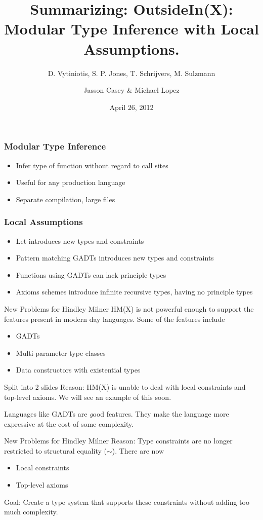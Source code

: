 \documentclass{beamer}
\title{Summarizing: OutsideIn(X): Modular Type Inference with Local Assumptions.}
\subtitle{D. Vytiniotis, S. P. Jones, T. Schrijvers, M. Sulzmann}
\author{Jasson Casey \& Michael Lopez}
\date{April 26, 2012}
\begin{document}
\begin{frame}
\titlepage
\end{frame}

\begin{frame}
\frametitle{Modular Type Inference}
\begin{itemize}
\item Infer type of function without regard to call sites
\item Useful for any production language
\item Separate compilation, large files
\end{itemize}
\end{frame}

\begin{frame}
\frametitle{Local Assumptions}
\begin{itemize}
\item Let introduces new types and constraints
\item Pattern matching GADTs introduces new types and constraints
\item Functions using GADTs can lack principle types
\item Axioms schemes introduce infinite recursive types, having no principle types
\end{itemize}
\end{frame}

\begin{frame}{New Problems for Hindley Milner}
HM(X) is not powerful enough to support the features present in modern day languages. Some of the features include
\begin{itemize}
\item GADTs
\item Multi-parameter type classes
\item Data constructors with existential types
\end{itemize}
Split into 2 slides
Reason: HM(X) is unable to deal with local constraints and top-level axioms. We will see an example of this soon.

Languages like GADTs are {\emph good} features. They make the language more expressive at the cost of some complexity.
\end{frame}

\begin{frame}{New Problems for Hindley Milner}
  Reason: Type constraints are no longer restricted to structural equality ($\sim$). There are now
  \begin{itemize}
    \item Local constraints
    \item Top-level axioms
  \end{itemize}
  Goal: Create a type system that supports these constraints without adding too much complexity.
\end{frame}
\end{document}
